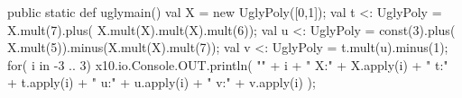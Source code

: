 %
%
%
%
%
%
%
%
%
%
%
\begin{xten}
  public static def uglymain() {
     val X = new UglyPoly([0,1]);
     val t <: UglyPoly = X.mult(7).plus(
                          X.mult(X).mult(X).mult(6));  
     val u <: UglyPoly = const(3).plus(
                           X.mult(5)).minus(X.mult(X).mult(7));
     val v <: UglyPoly = t.mult(u).minus(1);
     for( i in -3 .. 3) {
       x10.io.Console.OUT.println(
         "" + i + "	X:" + X.apply(i) + "	t:" + t.apply(i) 
          + "	u:" + u.apply(i) + "	v:" + v.apply(i)
         );
     }
  }
\end{xten}

